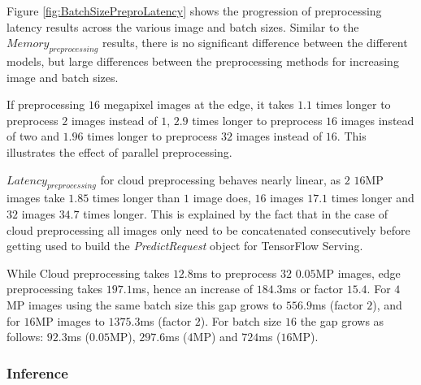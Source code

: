 Figure \ref{fig:BatchSizePreproLatency} shows the progression of preprocessing latency results across the various image and batch sizes.
Similar to the $Memory_{preprocessing}$ results, there is no significant difference between the different models, but large differences between the preprocessing methods for increasing image and batch sizes.

If preprocessing $16$ megapixel images at the edge, it takes $1.1$ times longer to preprocess $2$ images instead of $1$, $2.9$ times longer to preprocess $16$ images instead of two and $1.96$ times longer to preprocess $32$ images instead of $16$.
This illustrates the effect of parallel preprocessing.

$Latency_{preprocessing}$ for cloud preprocessing behaves nearly linear, as $2$ $16$MP images take $1.85$ times longer than $1$ image does, $16$ images $17.1$ times longer and $32$ images $34.7$ times longer.
This is explained by the fact that in the case of cloud preprocessing all images only need to be concatenated consecutively before getting used to build the \emph{PredictRequest} object for TensorFlow Serving. 


While Cloud preprocessing takes $12.8$ms to preprocess $32$ $0.05$MP images, edge preprocessing takes $197.1$ms, hence an increase of $184.3$ms or factor $15.4$. For $4$MP images using the same batch size this gap grows to $556.9$ms (factor $2$), and for $16$MP images to $1375.3$ms (factor $2$).
For batch size $16$ the gap grows as follows: $92.3$ms ($0.05$MP), $297.6$ms ($4$MP) and $724$ms ($16$MP).






\FloatBarrier
\subsubsection{Inference}

